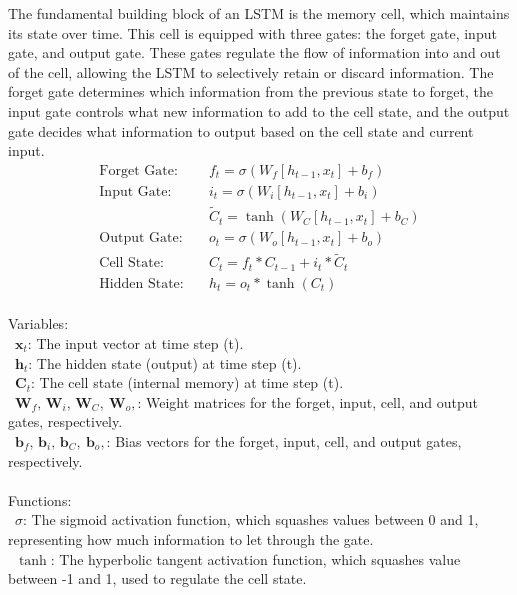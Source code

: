 \documentclass{ieeeojies}
\begin{document}
The fundamental building block of an LSTM is the memory cell, which maintains its state over time. This cell \cite{b4} is equipped with three gates: the forget gate, input gate, and output gate. These gates regulate the flow of information into and out of the cell, allowing the LSTM to selectively retain or discard information. The forget gate determines which information from the previous state to forget, the input gate controls what new information to add to the cell state, and the output gate decides what information to output based on the cell state and current input.
\begin{align*}
  \text{Forget Gate:} \quad & f_t = \sigma(W_f [h_{t-1}, x_t] + b_f) \\
  \text{Input Gate:} \quad & i_t = \sigma(W_i [h_{t-1}, x_t] + b_i) \\
  & \tilde{C}_t = \tanh(W_C [h_{t-1}, x_t] + b_C) \\
  \text{Output Gate:} \quad & o_t = \sigma(W_o [h_{t-1}, x_t] + b_o) \\
  \text{Cell State:} \quad & C_t = f_t * C_{t-1} + i_t * \tilde{C}_t \\
  \text{Hidden State:} \quad & h_t = o_t * \tanh(C_t)
\end{align*} 
\\
Variables: \\
         \indent\textbullet\ \textbf{\(\mathbf{x}_t\)}: The input vector at time step (t). \\
         \indent\textbullet\ \textbf{\(\mathbf{h}_t\)}: The hidden state (output) at time step (t). \\
         \indent\textbullet\ \textbf{\(\mathbf{C}_t\)}: The cell state (internal memory) at time step (t). \\
         \indent\textbullet\ \textbf{\(\mathbf{W}_f,\, \mathbf{W}_i,\, \mathbf{W}_C,\ \mathbf{W}_o,\)}: Weight matrices for the forget, input, cell, and output gates, respectively. \\ 
         \indent\textbullet\ \textbf{\(\mathbf{b}_f,\, \mathbf{b}_i,\, \mathbf{b}_C,\ \mathbf{b}_o,\)}: Bias vectors for the forget, input, cell, and output gates, respectively. \\
\\
Functions: \\
         \indent\textbullet\ \(\sigma\): The sigmoid activation function, which squashes values between 0 and 1, representing how much information to let through the gate. \\ 
         \indent\textbullet\ \(\tanh\): The hyperbolic tangent activation function, which squashes value between -1 and 1, used to regulate the cell state. \\ 
\end{document}
